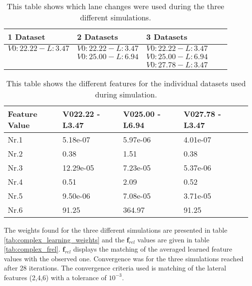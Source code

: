 \begin{table}[h!]
	\centering
	\begin{tabular}{@{}llllr@{}} \toprule
		1 Dataset    & 2 Datasets & 3 Datasets\\ \midrule
     $V0:22.22 - L:3.47$  & $V0:22.22 - L:3.47$    & $V0:22.22 - L:3.47$ 		\\
           			 & $V0:25.00 - L:6.94$      & $V0:25.00 - L:6.94$      \\
	        		 &        & $V0:27.78 - L:3.47$      \\ \bottomrule
	\end{tabular}
	\caption{This table shows which lane changes were used during the three different simulations.}
	\label{tab:datasets_overview}
\end{table} 


\begin{table}[h!]
	\centering
	\begin{tabular}{@{}llllr@{}} \toprule
	\textbf{Feature Value}     & V022.22 - L3.47 & V025.00 - L6.94 & V027.78 - L3.47\\ \midrule
		Nr.1       		  &5.18e-07       & 5.97e-06  & 4.01e-07 		\\
		Nr.2              & 0.38       & 1.51       & 0.38       \\
		Nr.3              & 12.29e-05  & 7.23e-05      & 5.37e-06      \\
		Nr.4              & 0.51       & 2.09       &   0.52    \\
		Nr.5              & 9.50e-06       & 7.08e-05       & 3.71e-05       \\
		Nr.6              & 91.25      & 364.97       & 91.25       \\ \bottomrule
	\end{tabular}
	\caption{This table shows the different features for the individual datasets used during simulation.}
	\label{tab:indi_features}
\end{table} 

The weights found for the three different simulations are presented in table \ref{tab:complex_learning_weights} and the $\bm{f}_{rel}$ values are given in table \ref{tab:complex_frel}.  $\bm{f}_{rel}$ displays the matching of the averaged learned feature values with the observed one. Convergence was for the three simulations reached after 28 iterations. The convergence criteria used is matching of the lateral features (2,4,6) with a tolerance of $10^{-3}$.


